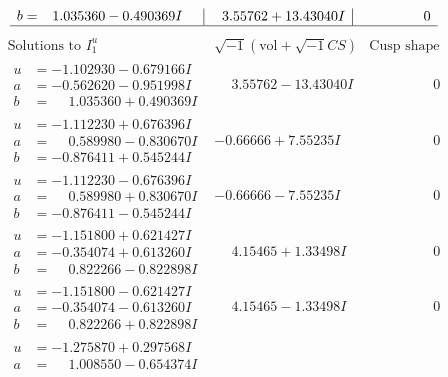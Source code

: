 \documentclass[1p]{elsarticle_modified}
\theoremstyle{definition}
\newcommand{\I}{\sqrt{-1}}
\begin{document}
$$\begin{array}{c|c|c}
\begin{aligned}
b &= \phantom{-}1.035360 - 0.490369 I\end{aligned}
 & \phantom{-}3.55762 + 13.43040 I & \phantom{-0.000000 } 0\\
 \hline 
 \end{array}$$\newpage$$\begin{array}{c|c|c}  
\text{Solutions to }I^u_{1}& \I (\text{vol} + \sqrt{-1}CS) & \text{Cusp shape}\\
 \hline 
\begin{aligned}
u &= -1.102930 - 0.679166 I \\
a &= -0.562620 - 0.951998 I \\
b &= \phantom{-}1.035360 + 0.490369 I\end{aligned}
 & \phantom{-}3.55762 - 13.43040 I & \phantom{-0.000000 } 0 \\ \hline\begin{aligned}
u &= -1.112230 + 0.676396 I \\
a &= \phantom{-}0.589980 - 0.830670 I \\
b &= -0.876411 + 0.545244 I\end{aligned}
 & -0.66666 + 7.55235 I & \phantom{-0.000000 } 0 \\ \hline\begin{aligned}
u &= -1.112230 - 0.676396 I \\
a &= \phantom{-}0.589980 + 0.830670 I \\
b &= -0.876411 - 0.545244 I\end{aligned}
 & -0.66666 - 7.55235 I & \phantom{-0.000000 } 0 \\ \hline\begin{aligned}
u &= -1.151800 + 0.621427 I \\
a &= -0.354074 + 0.613260 I \\
b &= \phantom{-}0.822266 - 0.822898 I\end{aligned}
 & \phantom{-}4.15465 + 1.33498 I & \phantom{-0.000000 } 0 \\ \hline\begin{aligned}
u &= -1.151800 - 0.621427 I \\
a &= -0.354074 - 0.613260 I \\
b &= \phantom{-}0.822266 + 0.822898 I\end{aligned}
 & \phantom{-}4.15465 - 1.33498 I & \phantom{-0.000000 } 0 \\ \hline\begin{aligned}
u &= -1.275870 + 0.297568 I \\
a &= \phantom{-}1.008550 - 0.654374 I \\

\end{aligned}
\end{array}$$
\end{document}
